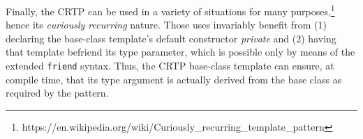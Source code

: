 Finally, the CRTP can be used in a variety of situations for many
purposes,{\cprotect\footnote{https://en.wikipedia.org/wiki/Curiously\_recurring\_template\_pattern}}
hence its \emph{curiously recurring} nature. Those uses invariably
benefit from (1) declaring the base-class template's default constructor
\emph{private} and (2) having that template befriend its type parameter,
which is possible only by means of the extended \texttt{friend} syntax.
Thus, the CRTP base-class template can ensure, at compile time, that its
type argument is actually derived from the base class as required by the
pattern.


